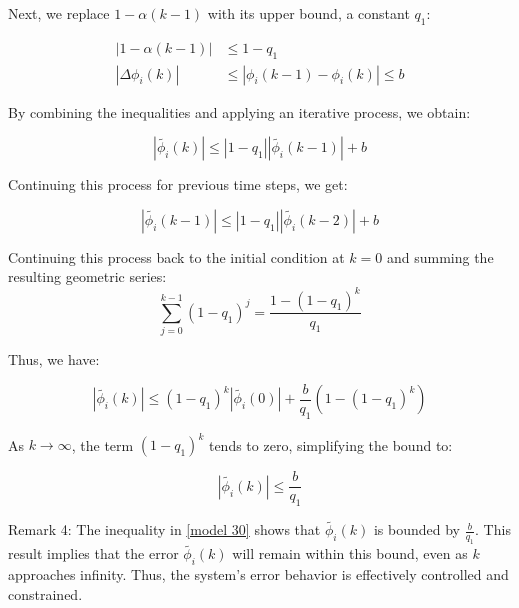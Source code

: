 \documentclass[journal,onecolumn]{IEEEtran}
\begin{document}
Next, we replace \(1 - \alpha(k-1)\) with its upper bound, a constant \(q_1\):

\begin{align}
\label{model 26}
|1 - \alpha(k-1)| &\leq 1 - q_1 \\
|\Delta \phi_i(k)| &\leq |\phi_i(k-1) - \phi_i(k)| \leq b
\end{align}

By combining the inequalities and applying an iterative process, we obtain:

\begin{equation}
\label{model 27}
|\tilde{\phi_i}(k)| \leq |1 - q_1| |\tilde{\phi_i}(k-1)| + b
\end{equation}

Continuing this process for previous time steps, we get:

\begin{equation}
\label{model 28}
|\tilde{\phi_i}(k-1)| \leq |1 - q_1| |\tilde{\phi_i}(k-2)| + b
\end{equation}

Continuing this process back to the initial condition at \(k=0\) and summing the resulting geometric series:
\[
\sum_{j=0}^{k-1} (1-q_1)^j = \frac{1-(1-q_1)^k}{q_1}
\]

Thus, we have:

\begin{equation}
\label{model 29}
|\tilde{\phi_i}(k)| \leq (1 - q_1)^k |\tilde{\phi_i}(0)| + \frac{b}{q_1} (1 - (1 - q_1)^k)
\end{equation}

As \(k \rightarrow \infty\), the term \((1-q_1)^k\) tends to zero, simplifying the bound to:

\begin{equation}
\label{model 30}
|\tilde{\phi_i}(k)| \leq \frac{b}{q_1}
\end{equation}



Remark 4: The inequality in \eqref{model 30} shows that \(\tilde{\phi_i}(k)\) is bounded by \(\frac{b}{q_1}\). This result implies that the error \(\tilde{\phi_i}(k)\) will remain within this bound, even as \(k\) approaches infinity. Thus, the system's error behavior is effectively controlled and constrained.

    

\end{document}
